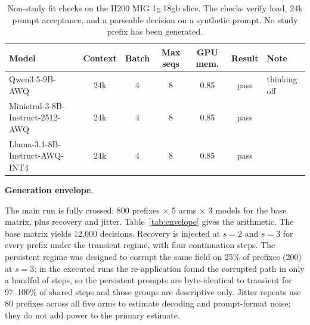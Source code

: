 \documentclass[a4paper,fleqn]{cas-sc}
\begin{document}
\begin{table}[pos=htbp]
  \centering
  \caption{Non-study fit checks on the H200 MIG 1g.18gb slice. The checks verify load, 24k
  prompt acceptance, and a parseable decision on a synthetic prompt. No study prefix has been
  generated.}
  \label{tab:fit}
  \small
  \begin{tabular}{>{\raggedright\arraybackslash}p{4.7cm}ccccc>{\raggedright\arraybackslash}p{2.6cm}}
    \toprule
    \textbf{Model} & \textbf{Context} & \textbf{Batch} & \textbf{Max seqs} & \textbf{GPU mem.} & \textbf{Result} & \textbf{Note} \\
    \midrule
    Qwen3.5-9B-AWQ                   & 24k & 4 & 8 & 0.85 & pass & thinking off \\
    Ministral-3-8B-Instruct-2512-AWQ & 24k & 4 & 8 & 0.85 & pass & \\
    Llama-3.1-8B-Instruct-AWQ-INT4   & 24k & 4 & 8 & 0.85 & pass & \\
    \bottomrule
  \end{tabular}
\end{table}

\noindent\textbf{Generation envelope}.\

The main run is fully crossed: 800 prefixes $\times$ 5 arms $\times$ 3 models for the base matrix,
plus recovery and jitter. Table~\ref{tab:envelope} gives the arithmetic. The base matrix yields
12{,}000 decisions. Recovery is injected at $s=2$ and $s=3$ for every prefix under the transient
regime, with four continuation steps. The persistent regime was designed to corrupt the same field
on 25\% of prefixes (200) at $s=3$; in the executed runs the re-application found the corrupted
path in only a handful of steps, so the persistent prompts are byte-identical to transient for
97--100\% of shared steps and those groups are descriptive only. Jitter repeats use 80 prefixes
across all five arms to estimate decoding and prompt-format noise; they do not add power to the
primary estimate.
\end{document}
